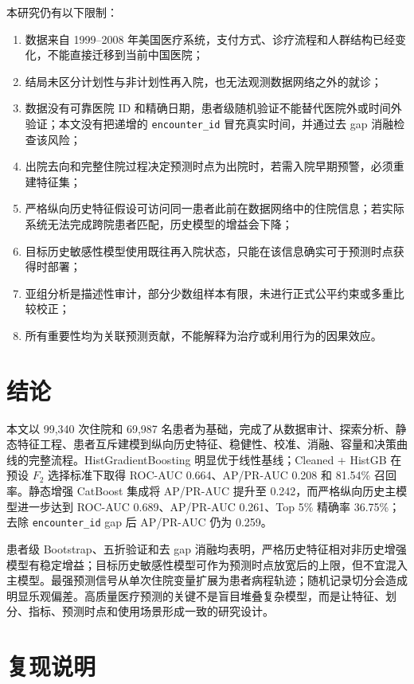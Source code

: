 \documentclass[UTF8,a4paper,11pt,fontset=none]{ctexart}
\begin{document}
本研究仍有以下限制：
\begin{enumerate}
  \item 数据来自 1999--2008 年美国医疗系统，支付方式、诊疗流程和人群结构已经变化，不能直接迁移到当前中国医院；
  \item 结局未区分计划性与非计划性再入院，也无法观测数据网络之外的就诊；
  \item 数据没有可靠医院 ID 和精确日期，患者级随机验证不能替代医院外或时间外验证；本文没有把递增的 \texttt{encounter\_id} 冒充真实时间，并通过去 gap 消融检查该风险；
  \item 出院去向和完整住院过程决定预测时点为出院时，若需入院早期预警，必须重建特征集；
  \item 严格纵向历史特征假设可访问同一患者此前在数据网络中的住院信息；若实际系统无法完成跨院患者匹配，历史模型的增益会下降；
  \item 目标历史敏感性模型使用既往再入院状态，只能在该信息确实可于预测时点获得时部署；
  \item 亚组分析是描述性审计，部分少数组样本有限，未进行正式公平约束或多重比较校正；
  \item 所有重要性均为关联预测贡献，不能解释为治疗或利用行为的因果效应。
\end{enumerate}

\section{结论}

本文以 99,340 次住院和 69,987 名患者为基础，完成了从数据审计、探索分析、静态特征工程、患者互斥建模到纵向历史特征、稳健性、校准、消融、容量和决策曲线的完整流程。HistGradientBoosting 明显优于线性基线；Cleaned + HistGB 在预设 $F_2$ 选择标准下取得 ROC-AUC 0.664、AP/PR-AUC 0.208 和 81.54\% 召回率。静态增强 CatBoost 集成将 AP/PR-AUC 提升至 0.242，而严格纵向历史主模型进一步达到 ROC-AUC 0.689、AP/PR-AUC 0.261、Top 5\% 精确率 36.75\%；去除 \texttt{encounter\_id} gap 后 AP/PR-AUC 仍为 0.259。

患者级 Bootstrap、五折验证和去 gap 消融均表明，严格历史特征相对非历史增强模型有稳定增益；目标历史敏感性模型可作为预测时点放宽后的上限，但不宜混入主模型。最强预测信号从单次住院变量扩展为患者病程轨迹；随机记录切分会造成明显乐观偏差。高质量医疗预测的关键不是盲目堆叠复杂模型，而是让特征、划分、指标、预测时点和使用场景形成一致的研究设计。

\FloatBarrier
\section*{复现说明}
\end{document}

